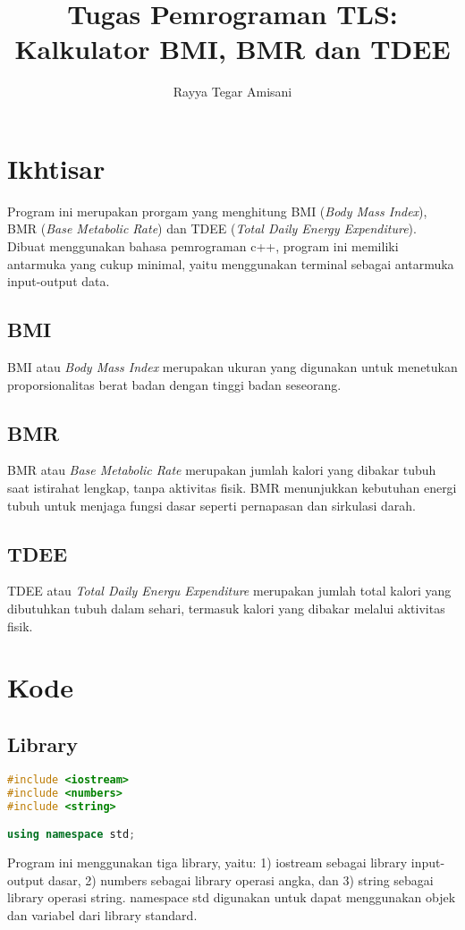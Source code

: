 \documentclass{article}
\begin{document}
\title{%
   Tugas Pemrograman TLS: \\
  Kalkulator BMI, BMR dan TDEE}
  \author{Rayya Tegar Amisani}
\maketitle

\section{Ikhtisar}
Program ini merupakan prorgam yang menghitung BMI (\textit{Body Mass Index}), BMR (\textit{Base Metabolic Rate}) dan TDEE (\textit{Total Daily Energy Expenditure}). Dibuat menggunakan bahasa pemrograman c++, program ini memiliki antarmuka yang cukup minimal, yaitu menggunakan terminal sebagai antarmuka input-output data.
\subsection{BMI}
BMI atau \textit{Body Mass Index} merupakan ukuran yang digunakan untuk menetukan proporsionalitas berat badan dengan tinggi badan seseorang.
\subsection{BMR}
BMR atau \textit{Base Metabolic Rate} merupakan jumlah kalori yang dibakar tubuh saat istirahat lengkap, tanpa aktivitas fisik. BMR menunjukkan kebutuhan energi tubuh untuk menjaga fungsi dasar seperti pernapasan dan sirkulasi darah. 
\subsection{TDEE}
TDEE atau \textit{Total Daily Energu Expenditure} merupakan jumlah total kalori yang dibutuhkan tubuh dalam sehari, termasuk kalori yang dibakar melalui aktivitas fisik. 
\section{Kode}

\subsection{Library}
\begin{lstlisting}[language=c++]
#include <iostream>
#include <numbers>
#include <string>

using namespace std;
\end{lstlisting}
Program ini menggunakan tiga library, yaitu: 1) iostream sebagai library input-output dasar, 2) numbers sebagai library operasi angka, dan 3) string sebagai library operasi string. namespace std digunakan untuk dapat menggunakan objek dan variabel dari library standard.
\end{document}
